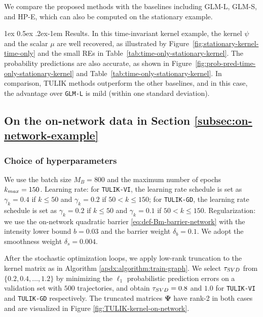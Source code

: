 \documentclass[11pt]{article}
\makeatletter
\theoremstyle{remark}
\theoremstyle{plain}
\renewcommand{\paragraph}{%
  \@startsection{paragraph}{4}%
  {\z@}{1ex \@plus 0.5ex \@minus .2ex}{-1em}%
  {\normalfont\normalsize\itshape}%
}
\makeatother
\begin{document}
We compare the proposed methods with the baselines including GLM-L, GLM-S, and HP-E, which can also be computed on the stationary example. 

  

\paragraph{Results.}
In this time-invariant kernel example, the kernel $\psi$ and the scalar $\mu$ are well recovered, as illustrated by Figure~\ref{fig:stationary-kernel-time-only}  and the small REs in Table~\ref{tab:time-only-stationary-kernel}. 
%
The probability predictions are also accurate, as shown in Figure~\ref{fig:prob-pred-time-only-stationary-kernel} and Table~\ref{tab:time-only-stationary-kernel}. 
In comparison, TULIK methods outperform the other baselines, and in this case, the advantage over \texttt{GLM-L} is mild (within one standard deviation). 







\subsection{On the on-network data in Section \ref{subsec:on-network-example}}

\subsubsection{Choice of hyperparameters}\label{apdx:choice-hyperparameters-on-network}

We use the batch size $M_B=800$ and the maximum number of epochs $k_{\rm max} = 150$. 
%
Learning rate:   
for \texttt{TULIK-VI}, the learning rate schedule is set as $\gamma_k = 0.4$ if $k\le 50$ and $\gamma_k = 0.2$ if  $50 < k \le 150 $; 
for \texttt{TULIK-GD}, the learning rate schedule is set as $\gamma_k = 0.2$ if $k\le 50$ and $\gamma_k = 0.1$ if  $50 < k \le 150 $. 
Regularization: 
we use the on-network quadratic barrier \eqref{eq:def-Bm-barrier-network} with the intensity lower bound $b=0.03$ and the barrier weight $\delta_b=0.1$.
We adopt the smoothness weight $\delta_s=0.004$. 

After the 
stochastic optimization
loops, we apply low-rank truncation to the kernel matrix as in Algorithm \ref{apdx:algorithm:train-graph}. We select $\tau_{\rm SVD}$ from $\{0.2, 0.4, \ldots, 1.2\}$ by  minimizing the $\ell_1$ probabilistic prediction errors on a validation set with $500$ trajectories, and obtain $\tau_{\rm SVD} = 0.8$ and $1.0$ for \texttt{TULIK-VI} and \texttt{TULIK-GD} respectively.
The truncated matrices $\mathbf{\Psi}$ have rank-2 in both cases and are visualized in Figure \ref{fig:TULIK-kernel-on-network}. 
\end{document}
